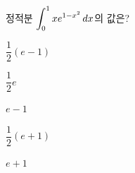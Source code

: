 정적분 $\displaystyle\int_{0}^{1}xe^{1-x^2}\mkern3mu dx$의 값은?
\begin{choices32}{\rule[-3ex]{0pt}{8ex}$\dfrac{1}{2}(e-1)$}{\rule[-3ex]{0pt}{8ex}$\dfrac{1}{2}e$}{\rule[-3ex]{0pt}{8ex}$e-1$}{\rule[-3ex]{0pt}{8ex}$\dfrac{1}{2}(e+1)$}{\rule[-3ex]{0pt}{8ex}$e+1$}\end{choices32}

